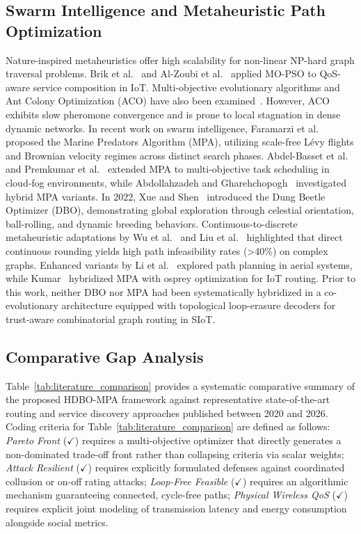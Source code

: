 \documentclass[journal,compsoc]{IEEEtran}
\begin{document}
\subsection{Swarm Intelligence and Metaheuristic Path Optimization}
Nature-inspired metaheuristics offer high scalability for non-linear NP-hard graph traversal problems. Brik et al.~\cite{brik2020qos} and Al-Zoubi et al.~\cite{al2021multiobjective} applied MO-PSO to QoS-aware service composition in IoT. Multi-objective evolutionary algorithms and Ant Colony Optimization (ACO) have also been examined~\cite{marche2020how, tian2022recommender}. However, ACO exhibits slow pheromone convergence and is prone to local stagnation in dense dynamic networks. In recent work on swarm intelligence, Faramarzi et al.~\cite{faramarzi2020marine} proposed the Marine Predators Algorithm (MPA), utilizing scale-free L\'evy flights and Brownian velocity regimes across distinct search phases. Abdel-Basset et al.~\cite{abdelbasset2021multi} and Premkumar et al.~\cite{premkumar2021multi} extended MPA to multi-objective task scheduling in cloud-fog environments, while Abdollahzadeh and Gharehchopogh~\cite{abdollahzadeh2021hybrid} investigated hybrid MPA variants. In 2022, Xue and Shen~\cite{xue2022dung} introduced the Dung Beetle Optimizer (DBO), demonstrating global exploration through celestial orientation, ball-rolling, and dynamic breeding behaviors. Continuous-to-discrete metaheuristic adaptations by Wu et al.~\cite{wu2023energy} and Liu et al.~\cite{liu2024discrete} highlighted that direct continuous rounding yields high path infeasibility rates (>40\%) on complex graphs. Enhanced variants by Li et al.~\cite{li2024enhanced} explored path planning in aerial systems, while Kumar~\cite{kumar2023marine} hybridized MPA with osprey optimization for IoT routing. Prior to this work, neither DBO nor MPA had been systematically hybridized in a co-evolutionary architecture equipped with topological loop-erasure decoders for trust-aware combinatorial graph routing in SIoT.

\subsection{Comparative Gap Analysis}
Table~\ref{tab:literature_comparison} provides a systematic comparative summary of the proposed HDBO-MPA framework against representative state-of-the-art routing and service discovery approaches published between 2020 and 2026. Coding criteria for Table~\ref{tab:literature_comparison} are defined as follows: \textit{Pareto Front} ($\checkmark$) requires a multi-objective optimizer that directly generates a non-dominated trade-off front rather than collapsing criteria via scalar weights; \textit{Attack Resilient} ($\checkmark$) requires explicitly formulated defenses against coordinated collusion or on-off rating attacks; \textit{Loop-Free Feasible} ($\checkmark$) requires an algorithmic mechanism guaranteeing connected, cycle-free paths; \textit{Physical Wireless QoS} ($\checkmark$) requires explicit joint modeling of transmission latency and energy consumption alongside social metrics.
\end{document}
